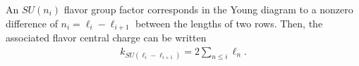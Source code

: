 \documentclass[a4paper,11pt]{article}
\newcommand{\ba}[1]{\begin{align} #1 \end{align} }
\begin{document}
An $SU(n_i)$ flavor group factor corresponds in the Young diagram to a nonzero difference of $n_i=\ell_i-\ell_{i+1}$ between the lengths of two rows. Then, the associated flavor central charge can be written
	\ba{
	k_{SU(\ell_i-\ell_{i+1})}=2\sum_{n\leq i}\ell_n.\label{eq:ky}
	}
	
	

 




\end{document}
